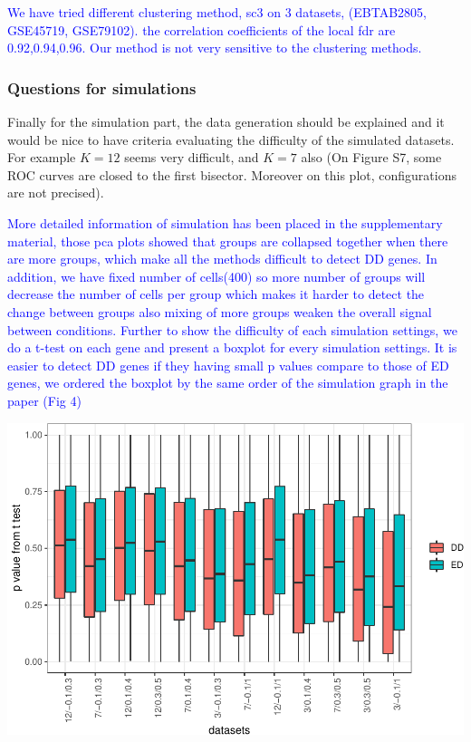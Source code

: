\documentclass[]{article}
\begin{document}
\textcolor{blue}{We have tried different clustering method, sc3 on 3 datasets, (EBTAB2805, GSE45719, GSE79102). 
the correlation coefficients of the local fdr are 0.92,0.94,0.96. Our method is not very sensitive to the clustering methods.}

\subsubsection{Questions for
simulations}\label{questions-for-simulations}

Finally for the simulation part, the data generation should be explained
and it would be nice to have criteria evaluating the difficulty of the
simulated datasets. For example \(K=12\) seems very difficult, and
\(K=7\) also (On Figure S7, some ROC curves are closed to the first
bisector. Moreover on this plot, configurations are not precised).

\textcolor{blue}{More detailed information of simulation has been placed in the supplementary material, those pca plots showed that groups are collapsed together when there are more groups, which make all the methods difficult to detect DD genes. In addition, we have fixed number of cells(400) so more number of groups will decrease the number of cells per group which makes it harder to detect the change between groups also mixing of more groups weaken the overall signal between conditions.
Further to show the difficulty of each simulation settings, we do a t-test on each gene and present a boxplot for every simulation settings. It is easier to detect DD genes if they having small p values compare to those of ED genes, we ordered the boxplot by the same order of the simulation graph in the paper (Fig 4)}

\includegraphics{Revision_files/figure-latex/unnamed-chunk-2-1.pdf}
\end{document}
